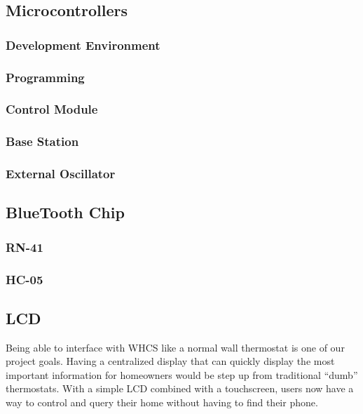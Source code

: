 \subsection{Microcontrollers}


\subsubsection{Development Environment}

\subsubsection{Programming}

\subsubsection{Control Module}

\subsubsection{Base Station}

\subsubsection{External Oscillator}

\subsection{BlueTooth Chip}

\subsubsection{RN-41}

\subsubsection{HC-05}

\subsection{LCD}
Being able to interface with WHCS like a normal wall thermostat is one of our
project goals. Having a centralized display that can quickly display the most
important information for homeowners would be step up from traditional ``dumb''
thermostats. With a simple LCD combined with a touchscreen, users now have a
way to control and query their home without having to find their phone.

